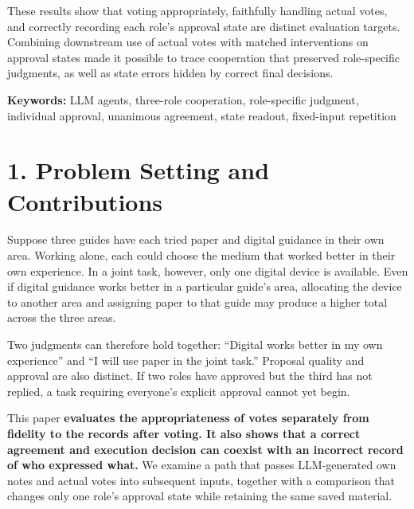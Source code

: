\documentclass[10pt,a4paper]{article}
\begin{document}
These results show that voting appropriately, faithfully handling actual votes, and correctly recording each role's approval state are distinct evaluation targets. Combining downstream use of actual votes with matched interventions on approval states made it possible to trace cooperation that preserved role-specific judgments, as well as state errors hidden by correct final decisions.

\textbf{Keywords:} LLM agents, three-role cooperation, role-specific judgment, individual approval, unanimous agreement, state readout, fixed-input repetition

\clearpage

\section{1. Problem Setting and Contributions}\label{paper-04-problem-setting-and-contributions}

Suppose three guides have each tried paper and digital guidance in their own area. Working alone, each could choose the medium that worked better in their own experience. In a joint task, however, only one digital device is available. Even if digital guidance works better in a particular guide's area, allocating the device to another area and assigning paper to that guide may produce a higher total across the three areas.

Two judgments can therefore hold together: ``Digital works better in my own experience'' and ``I will use paper in the joint task.'' Proposal quality and approval are also distinct. If two roles have approved but the third has not replied, a task requiring everyone's explicit approval cannot yet begin.

This paper \textbf{evaluates the appropriateness of votes separately from fidelity to the records after voting. It also shows that a correct agreement and execution decision can coexist with an incorrect record of who expressed what.} We examine a path that passes LLM-generated own notes and actual votes into subsequent inputs, together with a comparison that changes only one role's approval state while retaining the same saved material.
\end{document}
